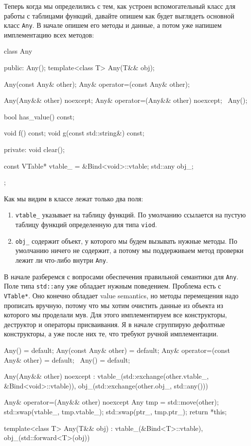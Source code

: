 Теперь когда мы определились с тем, как устроен вспомогательный класс для работы с таблицами функций, давайте опишем как будет выглядеть основной класс \texttt{Any}.
В начале опишем его методы и данные, а потом уже напишем имплементацию всех методов:
\begin{cppcode}
class Any {
public:
  Any();
  template<class T>
  Any(T&& obj);

  Any(const Any& other);
  Any& operator=(const Any& other);

  Any(Any&& other) noexcept;
  Any& operator=(Any&& other) noexcept;
  ~Any();

  bool has_value() const;

  void f() const;
  void g(const std::string&) const;

private:
  void clear();

  const VTable* vtable_ = &Bind<void>::vtable;
  std::any obj_;
};
\end{cppcode}
Как мы видим в классе лежат только два поля:
\begin{enumerate}
\item \texttt{vtable\_} указывает на таблицу функций.
По умолчанию ссылается на пустую таблицу функций определенную для типа \texttt{viod}.

\item \texttt{obj\_} содержит объект, у которого мы будем вызывать нужные методы.
По умолчанию ничего не содержит, а потому мы поддерживаем метод проверки лежит ли что-либо внутри \texttt{Any}.
\end{enumerate}
В начале разберемся с вопросами обеспечения правильной семантики для \texttt{Any}.
Поле типа \texttt{std::any} уже обладает нужным поведением.
Проблема есть с \texttt{VTable*}.
Оно конечно обладает value semantics, но методы перемещения надо прописать вручную, потому что мы хотим очистить данные из объекта из которого мы проделали мув.
Для этого имплементируем все конструкторы, деструктор и операторы присваивания.
Я в начале сгруппирую дефолтные конструкторы, а уже после них те, что требуют ручной имплементации.
\begin{cppcode}
  Any() = default;
  Any(const Any& other) = default;
  Any& operator=(const Any& other) = default;
  ~Any() = default;

  Any(Any&& other) noexcept
      : vtable_(std::exchange(other.vtable_, &Bind<void>::vtable)),
        obj_(std::exchange(other.obj_, std::any())) {
  }
  
  Any& operator=(Any&& other) noexcept {
    Any tmp = std::move(other);
    std::swap(vtable_, tmp.vtable_);
    std::swap(ptr_, tmp.ptr_);
    return *this;
  }
  
  template<class T>
  Any(T&& obj) : vtable_(&Bind<T>::vtable), obj_(std::forward<T>(obj)) {
  }
\end{cppcode}

